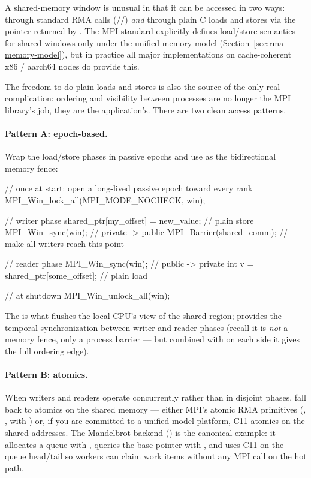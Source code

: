 A shared-memory window is unusual in that it can be accessed in two ways: through standard RMA calls (//) \emph{and} through plain C loads and stores via the pointer returned by . The MPI standard explicitly defines load/store semantics for shared windows only under the unified memory model (Section~\ref{sec:rma-memory-model}), but in practice all major implementations on cache-coherent x86 / aarch64 nodes do provide this.

The freedom to do plain loads and stores is also the source of the only real complication: ordering and visibility between processes are no longer the MPI library's job, they are the application's. There are two clean access patterns.

\paragraph{Pattern A: epoch-based.} Wrap the load/store phases in passive epochs and use  as the bidirectional memory fence:

\begin{codeblock}[language=C]
// once at start: open a long-lived passive epoch toward every rank
MPI_Win_lock_all(MPI_MODE_NOCHECK, win);

// writer phase
shared_ptr[my_offset] = new_value;          // plain store
MPI_Win_sync(win);                          // private -> public
MPI_Barrier(shared_comm);                   // make all writers reach this point

// reader phase
MPI_Win_sync(win);                          // public -> private
int v = shared_ptr[some_offset];            // plain load

// at shutdown
MPI_Win_unlock_all(win);
\end{codeblock}

The  is what flushes the local CPU's view of the shared region;  provides the temporal synchronization between writer and reader phases (recall it is \emph{not} a memory fence, only a process barrier --- but combined with  on each side it gives the full ordering edge).

\paragraph{Pattern B: atomics.} When writers and readers operate concurrently rather than in disjoint phases, fall back to atomics on the shared memory --- either MPI's atomic RMA primitives (, ,  with ) or, if you are committed to a unified-model platform, C11 atomics on the shared addresses. The Mandelbrot  backend () is the canonical example: it allocates a queue with , queries the base pointer with , and uses C11  on the queue head/tail so workers can claim work items without any MPI call on the hot path.

